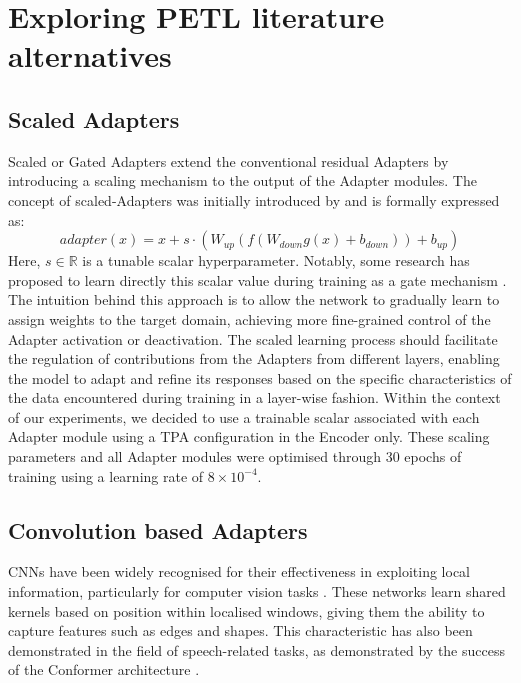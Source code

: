 \section{Exploring PETL literature alternatives}
\label{section:petl_alt}
\subsection{Scaled Adapters}
Scaled or Gated Adapters extend the conventional residual Adapters by introducing a scaling mechanism to the output of the Adapter modules. The concept of scaled-Adapters was initially introduced by \cite{he2022towards} and is formally expressed as:
\begin{equation}
    adapter(x) = x + s \cdot (W_{up}(f(W_{down}g(x) + b_{down})) + b_{up})    
\end{equation}
Here, $s \in \mathbb{R}$ is a tunable scalar hyperparameter. Notably, some research has proposed to learn directly this scalar value during training as a gate mechanism \cite{mao-etal-2022-unipelt}. The intuition behind this approach is to allow the network to gradually learn to assign weights to the target domain, achieving more fine-grained control of the Adapter activation or deactivation. The scaled learning process should facilitate the regulation of contributions from the Adapters from different layers, enabling the model to adapt and refine its responses based on the specific characteristics of the data encountered during training in a layer-wise fashion.
Within the context of our experiments, we decided to use a trainable scalar associated with each Adapter module using a \ac{TPA} configuration in the Encoder only. These scaling parameters and all Adapter modules were optimised through 30 epochs of training using a learning rate of $8 \times 10^{-4}$.

\subsection{Convolution based Adapters}
\acp{CNN} have been widely recognised for their effectiveness in exploiting local information, particularly for computer vision tasks \cite{9879745}. These networks learn shared kernels based on position within localised windows, giving them the ability to capture features such as edges and shapes. This characteristic has also been demonstrated in the field of speech-related tasks, as demonstrated by the success of the Conformer architecture \cite{gulati2020conformer}.

